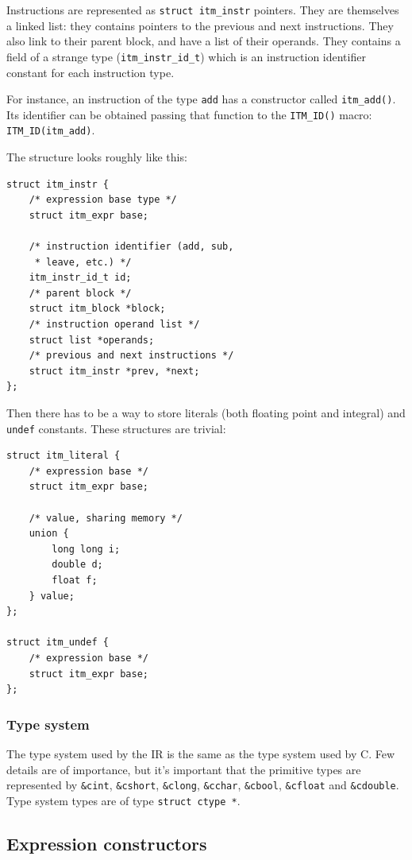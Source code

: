 \documentclass[12pt, a4paper]{article}
\begin{document}
Instructions are represented as \verb+struct itm_instr+ pointers. They are
themselves a linked list: they contains pointers to the previous and next
instructions. They also link to their parent block, and have a list of their
operands. They contains a field of a strange type (\verb+itm_instr_id_t+) which
is an instruction identifier constant for each instruction type.

For instance, an instruction of the type \verb+add+ has a constructor called
\verb+itm_add()+. Its identifier can be obtained passing that function to the
\verb+ITM_ID()+ macro: \verb+ITM_ID(itm_add)+.

The structure looks roughly like this:

\begin{lstlisting}
struct itm_instr {
	/* expression base type */
	struct itm_expr base;

	/* instruction identifier (add, sub,
	 * leave, etc.) */
	itm_instr_id_t id;
	/* parent block */
	struct itm_block *block;
	/* instruction operand list */
	struct list *operands;
	/* previous and next instructions */
	struct itm_instr *prev, *next;
};
\end{lstlisting}

Then there has to be a way to store literals (both floating point and integral)
and \verb+undef+ constants. These structures are trivial:

\begin{lstlisting}
struct itm_literal {
	/* expression base */
	struct itm_expr base;

	/* value, sharing memory */
	union {
		long long i;
		double d;
		float f;
	} value;
};

struct itm_undef {
	/* expression base */
	struct itm_expr base;
};
\end{lstlisting}

\subsubsection{Type system}
The type system used by the IR is the same as the type system used by C. Few
details are of importance, but it's important that the primitive types are
represented by \verb+&cint+, \verb+&cshort+, \verb+&clong+, \verb+&cchar+,
\verb+&cbool+, \verb+&cfloat+ and \verb+&cdouble+. Type system types are of type
\verb+struct ctype *+.

\subsection{Expression constructors}
\end{document}
